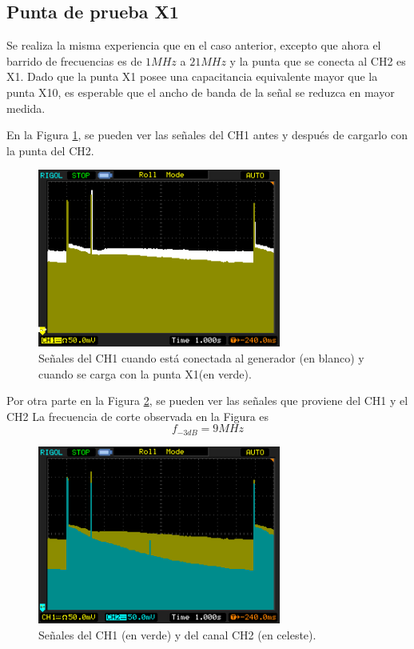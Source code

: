 \documentclass[a4paper,10pt]{article}
\begin{document}
		\subsection{Punta de prueba X1}
		Se realiza la misma experiencia que en el caso anterior, excepto que ahora el barrido de frecuencias es de $1MHz$ a $21MHz$ y la punta que se conecta al CH2 es X1. Dado que la punta X1 posee una capacitancia equivalente mayor que la punta X10, es esperable que el ancho de banda de la se\~nal se reduzca en mayor medida.

		En la Figura \ref{img003}, se pueden ver las se\~nales del CH1 antes y despu\'es de cargarlo con la punta del CH2. 
		\begin{figure}[!htb]
			\centering
			\includegraphics[width=8cm]{Imagenes/Mediciones instrumentos/NewFile4.png}
			\caption{Se\~nales del CH1 cuando est\'a conectada al generador (en blanco) y cuando se carga con la punta X1(en verde).} \label{img003}
		\end{figure}
		
		Por otra parte en la Figura \ref{img002}, se pueden ver las se\~nales que proviene del CH1 y el CH2
		La frecuencia de corte observada en la Figura es $$f_{-3dB}=9MHz$$
		\begin{figure}[!htb]
			\centering
			\includegraphics[width=8cm]{Imagenes/Mediciones instrumentos/NewFile3.png}
			\caption{Se\~nales del CH1 (en verde) y del canal CH2 (en celeste).} \label{img002}
		\end{figure}						
		
\end{document}

